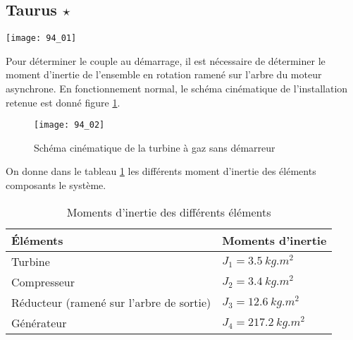 \normaltrue \difficilefalse \tdifficilefalse
\correctionfalse


\subsection*{Taurus $\star$ \label{CIN:03:C2:06:94}}
\setcounter{question}{0}


\ifcorrection
\else
{}
\fi

\ifprof
\else

\begin{marginfigure}
\texttt{[image: 94\_01]}
\end{marginfigure}
Pour déterminer le couple au démarrage, il est nécessaire de déterminer le moment d’inertie de
 l’ensemble en rotation ramené sur l’arbre du moteur asynchrone.
 En fonctionnement normal, le schéma cinématique de l’installation retenue est donné figure \ref{fig_94_02}.
 

\begin{figure}[!h]
\texttt{[image: 94\_02]}
\caption{Schéma cinématique de la turbine à gaz sans démarreur \label{fig_94_02}}
\end{figure}

On donne dans le tableau \ref{tab_94_01} les différents moment d'inertie des éléments composants le système.


\begin{table}[!h]
\begin{tabular}{ll}
\hline
Éléments & Moments d’inertie \\ \hline
 Turbine 	& $J_1= \SI{3,5}{kg.m^2}$ \\
 Compresseur 	& $J_2=\SI{3,4}{kg.m^2}$\\
 Réducteur (ramené sur l’arbre de sortie)&  $J_3=\SI{12,6}{kg.m^2}$\\
 Générateur 	& $J_4=\SI{217,2}{kg.m^2}$\\
 \hline
\end{tabular}
\caption{Moments d’inertie des différents éléments \label{tab_94_01}}
 \end{table}


